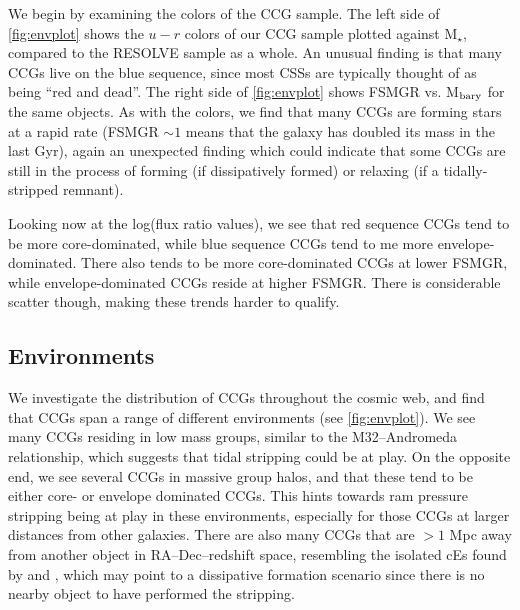 \documentclass[iop,apj]{emulateapj}
\begin{document}
\noindent We begin by examining the colors of the CCG sample. The left side of \autoref{fig:envplot} shows the $u-r$ colors of our CCG sample plotted against M$_{\star}$, compared to the RESOLVE sample as a whole. An unusual finding is that many CCGs live on the blue sequence, since most CSSs are typically thought of as being ``red and dead''. The right side of \autoref{fig:envplot} shows FSMGR vs. M$_{\rm bary}$ for the same objects. As with the colors, we find that many CCGs are forming stars at a rapid rate (FSMGR $\sim1$ means that the galaxy has doubled its mass in the last Gyr), again an unexpected finding which could indicate that some CCGs are still in the process of forming (if dissipatively formed) or relaxing (if a tidally-stripped remnant).

Looking now at the log(flux ratio values), we see that red sequence CCGs tend to be more core-dominated, while blue sequence CCGs tend to me more envelope-dominated. There also tends to be more core-dominated CCGs at lower FSMGR, while envelope-dominated CCGs reside at higher FSMGR. There is considerable scatter though, making these trends harder to qualify.


\subsection{Environments}
\noindent We investigate the distribution of CCGs throughout the cosmic web, and find that CCGs span a range of different environments (see \autoref{fig:envplot}). We see many CCGs residing in low mass groups, similar to the M32--Andromeda relationship, which suggests that tidal stripping could be at play. On the opposite end, we see several CCGs in massive group halos, and that these tend to be either core- or envelope dominated CCGs. This hints towards ram pressure stripping being at play in these environments, especially for those CCGs at larger distances from other galaxies. There are also many CCGs that are $>1$ Mpc away from another object in RA--Dec--redshift space, resembling the isolated cEs found by \citet{Huxor2013} and \citet{Paudel2014}, which may point to a dissipative formation scenario since there is no nearby object to have performed the stripping.
 
\end{document}
